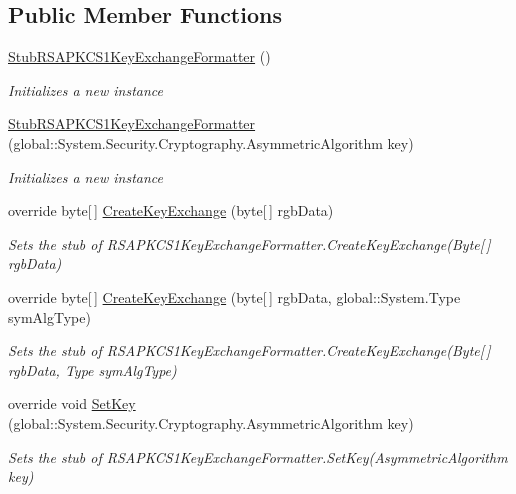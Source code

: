 \subsection*{Public Member Functions}
\begin{DoxyCompactItemize}
\item 
\hyperlink{class_system_1_1_security_1_1_cryptography_1_1_fakes_1_1_stub_r_s_a_p_k_c_s1_key_exchange_formatter_a801488d3cb686e197c9e7e327672b224}{Stub\-R\-S\-A\-P\-K\-C\-S1\-Key\-Exchange\-Formatter} ()
\begin{DoxyCompactList}\small\item\em Initializes a new instance\end{DoxyCompactList}\item 
\hyperlink{class_system_1_1_security_1_1_cryptography_1_1_fakes_1_1_stub_r_s_a_p_k_c_s1_key_exchange_formatter_adcab2b3fa8417261361d1989e2068e52}{Stub\-R\-S\-A\-P\-K\-C\-S1\-Key\-Exchange\-Formatter} (global\-::\-System.\-Security.\-Cryptography.\-Asymmetric\-Algorithm key)
\begin{DoxyCompactList}\small\item\em Initializes a new instance\end{DoxyCompactList}\item 
override byte\mbox{[}$\,$\mbox{]} \hyperlink{class_system_1_1_security_1_1_cryptography_1_1_fakes_1_1_stub_r_s_a_p_k_c_s1_key_exchange_formatter_aa6163250918c5c5bc4d200d77b6c040f}{Create\-Key\-Exchange} (byte\mbox{[}$\,$\mbox{]} rgb\-Data)
\begin{DoxyCompactList}\small\item\em Sets the stub of R\-S\-A\-P\-K\-C\-S1\-Key\-Exchange\-Formatter.\-Create\-Key\-Exchange(\-Byte\mbox{[}$\,$\mbox{]} rgb\-Data)\end{DoxyCompactList}\item 
override byte\mbox{[}$\,$\mbox{]} \hyperlink{class_system_1_1_security_1_1_cryptography_1_1_fakes_1_1_stub_r_s_a_p_k_c_s1_key_exchange_formatter_a819ffccf6a22659b336eb4ba35609b80}{Create\-Key\-Exchange} (byte\mbox{[}$\,$\mbox{]} rgb\-Data, global\-::\-System.\-Type sym\-Alg\-Type)
\begin{DoxyCompactList}\small\item\em Sets the stub of R\-S\-A\-P\-K\-C\-S1\-Key\-Exchange\-Formatter.\-Create\-Key\-Exchange(\-Byte\mbox{[}$\,$\mbox{]} rgb\-Data, Type sym\-Alg\-Type)\end{DoxyCompactList}\item 
override void \hyperlink{class_system_1_1_security_1_1_cryptography_1_1_fakes_1_1_stub_r_s_a_p_k_c_s1_key_exchange_formatter_ad52f5ae66f40a435f06e29046a56363c}{Set\-Key} (global\-::\-System.\-Security.\-Cryptography.\-Asymmetric\-Algorithm key)
\begin{DoxyCompactList}\small\item\em Sets the stub of R\-S\-A\-P\-K\-C\-S1\-Key\-Exchange\-Formatter.\-Set\-Key(\-Asymmetric\-Algorithm key)\end{DoxyCompactList}\end{DoxyCompactItemize}
